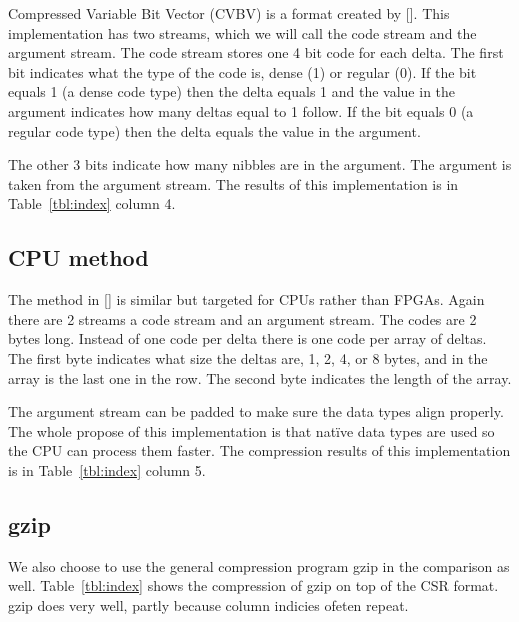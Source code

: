 Compressed Variable Bit Vector (CVBV) is a format created by [\cite{prelim:kestur}]. This implementation has two streams, which we will call the code stream and the argument stream. The code stream stores one 4 bit code for each delta. The first bit indicates what the type of the code is, dense (1) or regular (0). If the bit equals 1 (a dense code type) then the delta equals 1 and the value in the argument indicates how many deltas equal to 1 follow. If the bit equals 0 (a regular code type) then the delta equals the value in the argument.

The other 3 bits indicate how many nibbles are in the argument. The argument is taken from the argument stream. The results of this implementation is in Table~\ref{tbl:index} column 4.
\subsection{CPU method}

The method in [\cite{prelim:kourtis}] is similar but targeted for CPUs rather than FPGAs. Again there are 2 streams a code stream and an argument stream. The codes are 2 bytes long. Instead of one code per delta there is one code per array of deltas. The first byte indicates what size the deltas are, 1, 2, 4, or 8 bytes, and in the array is the last one in the row. The second byte indicates the length of the array.

The argument stream can be padded to make sure the data types align properly. The whole propose of this implementation is that nat\"ive data types are used so the CPU can process them faster. The compression results of this implementation is in Table~\ref{tbl:index} column 5.

\subsection{gzip}
We also choose to use the general compression program gzip in the comparison as well. Table~\ref{tbl:index} shows the compression of gzip on top of the CSR format. gzip does very well, partly because column indicies ofeten repeat.



